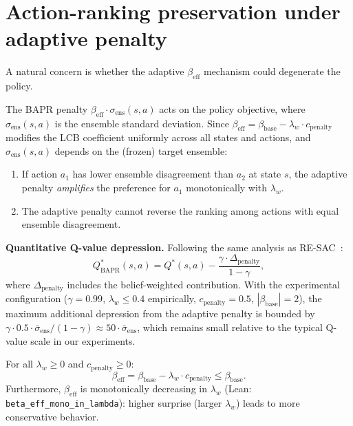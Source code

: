 \section{Action-ranking preservation under adaptive penalty}
\label{app:nondegen}

A natural concern is whether the adaptive $\beta_{\text{eff}}$ mechanism could degenerate the policy.

\begin{proposition}
    \label{prop:ranking}
    The BAPR penalty $\beta_{\text{eff}} \cdot \sigma_{\text{ens}}(s,a)$ acts on the policy objective, where $\sigma_{\text{ens}}(s,a)$ is the ensemble standard deviation. Since $\beta_{\text{eff}} = \beta_{\text{base}} - \lambda_w \cdot c_{\text{penalty}}$ modifies the LCB coefficient uniformly across all states and actions, and $\sigma_{\text{ens}}(s,a)$ depends on the (frozen) target ensemble:
    \begin{enumerate}
        \item If action $a_1$ has lower ensemble disagreement than $a_2$ at state $s$, the adaptive penalty \emph{amplifies} the preference for $a_1$ monotonically with $\lambda_w$.
        \item The adaptive penalty cannot reverse the ranking among actions with equal ensemble disagreement.
    \end{enumerate}
\end{proposition}

\noindent\textbf{Quantitative Q-value depression.}
Following the same analysis as RE-SAC~\cite{Zhang2026RESAC}:
\begin{equation}
    Q^*_{\text{BAPR}}(s,a) = Q^*(s,a) - \frac{\gamma \cdot \Delta_{\text{penalty}}}{1-\gamma},
\end{equation}
where $\Delta_{\text{penalty}}$ includes the belief-weighted contribution. With the experimental configuration ($\gamma = 0.99$, $\lambda_w \leq 0.4$ empirically, $c_{\text{penalty}} = 0.5$, $|\beta_{\text{base}}| = 2$), the maximum additional depression from the adaptive penalty is bounded by $\gamma \cdot 0.5 \cdot \bar{\sigma}_{\text{ens}}/(1-\gamma) \approx 50 \cdot \bar{\sigma}_{\text{ens}}$, which remains small relative to the typical Q-value scale in our experiments.

\begin{proposition}
    \label{prop:beta_mono}
    For all $\lambda_w \geq 0$ and $c_{\text{penalty}} \geq 0$:
    \begin{equation}
        \beta_{\text{eff}} = \beta_{\text{base}} - \lambda_w \cdot c_{\text{penalty}} \leq \beta_{\text{base}}.
    \end{equation}
    Furthermore, $\beta_{\text{eff}}$ is monotonically decreasing in $\lambda_w$ (Lean: \texttt{beta\_eff\_mono\_in\_lambda}): higher surprise (larger $\lambda_w$) leads to more conservative behavior.
\end{proposition}

